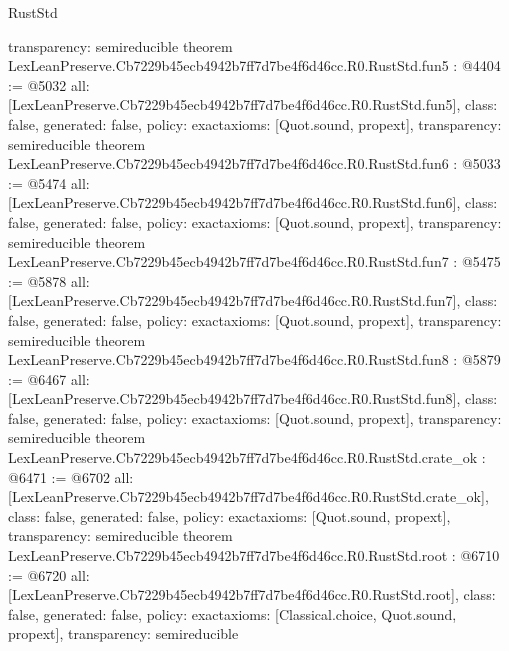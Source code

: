 \begin{lexlean}{RustStd}
\begin{coremodule}
{  transparency: semireducible
}
theorem LexLeanPreserve.Cb7229b45ecb4942b7ff7d7be4f6d46cc.R0.RustStd.fun5 : @4404 := @5032 {
  all: [LexLeanPreserve.Cb7229b45ecb4942b7ff7d7be4f6d46cc.R0.RustStd.fun5],
  class: false,
  generated: false,
  policy: exact{axioms: [Quot.sound, propext]},
  transparency: semireducible
}
theorem LexLeanPreserve.Cb7229b45ecb4942b7ff7d7be4f6d46cc.R0.RustStd.fun6 : @5033 := @5474 {
  all: [LexLeanPreserve.Cb7229b45ecb4942b7ff7d7be4f6d46cc.R0.RustStd.fun6],
  class: false,
  generated: false,
  policy: exact{axioms: [Quot.sound, propext]},
  transparency: semireducible
}
theorem LexLeanPreserve.Cb7229b45ecb4942b7ff7d7be4f6d46cc.R0.RustStd.fun7 : @5475 := @5878 {
  all: [LexLeanPreserve.Cb7229b45ecb4942b7ff7d7be4f6d46cc.R0.RustStd.fun7],
  class: false,
  generated: false,
  policy: exact{axioms: [Quot.sound, propext]},
  transparency: semireducible
}
theorem LexLeanPreserve.Cb7229b45ecb4942b7ff7d7be4f6d46cc.R0.RustStd.fun8 : @5879 := @6467 {
  all: [LexLeanPreserve.Cb7229b45ecb4942b7ff7d7be4f6d46cc.R0.RustStd.fun8],
  class: false,
  generated: false,
  policy: exact{axioms: [Quot.sound, propext]},
  transparency: semireducible
}
theorem LexLeanPreserve.Cb7229b45ecb4942b7ff7d7be4f6d46cc.R0.RustStd.crate_ok : @6471 := @6702 {
  all: [LexLeanPreserve.Cb7229b45ecb4942b7ff7d7be4f6d46cc.R0.RustStd.crate_ok],
  class: false,
  generated: false,
  policy: exact{axioms: [Quot.sound, propext]},
  transparency: semireducible
}
theorem LexLeanPreserve.Cb7229b45ecb4942b7ff7d7be4f6d46cc.R0.RustStd.root : @6710 := @6720 {
  all: [LexLeanPreserve.Cb7229b45ecb4942b7ff7d7be4f6d46cc.R0.RustStd.root],
  class: false,
  generated: false,
  policy: exact{axioms: [Classical.choice, Quot.sound, propext]},
  transparency: semireducible
}


\end{coremodule}
\end{lexlean}
